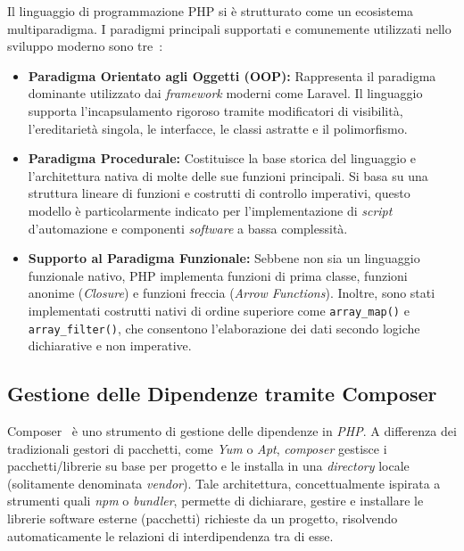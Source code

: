 Il linguaggio di programmazione PHP si è strutturato come un ecosistema multiparadigma. I paradigmi principali supportati e comunemente utilizzati nello sviluppo moderno sono tre~\autocite{PHPPrefaceManual}:
\begin{itemize}
	\item \textbf{Paradigma Orientato agli Oggetti (OOP):} Rappresenta il paradigma dominante utilizzato dai \textit{framework} moderni come Laravel. Il linguaggio supporta l'incapsulamento rigoroso tramite modificatori di visibilità, l'ereditarietà singola, le interfacce, le classi astratte e il polimorfismo.
	\item \textbf{Paradigma Procedurale:} Costituisce la base storica del linguaggio e l'architettura nativa di molte delle sue funzioni principali. Si basa su una struttura lineare di funzioni e costrutti di controllo imperativi, questo modello è particolarmente indicato per l'implementazione di \textit{script} d'automazione e componenti \textit{software} a bassa complessità.
	\item \textbf{Supporto al Paradigma Funzionale:} Sebbene non sia un linguaggio funzionale nativo, PHP implementa funzioni di prima classe, funzioni anonime (\textit{Closure}) e funzioni freccia (\textit{Arrow Functions}). Inoltre, sono stati implementati costrutti nativi di ordine superiore come \texttt{array\_map()} e \texttt{array\_filter()}, che consentono l'elaborazione dei dati secondo logiche dichiarative e non imperative.
\end{itemize}


\subsection{Gestione delle Dipendenze tramite Composer}
Composer~\autocite{Composer} è uno strumento di gestione delle dipendenze in \textit{PHP}. A differenza dei tradizionali gestori di pacchetti, come \textit{Yum} o \textit{Apt}, \textit{composer}
gestisce i pacchetti/librerie su base per progetto e le installa in una \textit{directory} locale (solitamente denominata \textit{vendor}). Tale architettura, concettualmente ispirata a strumenti quali \textit{npm} o \textit{bundler}, permette di dichiarare, gestire e
installare le librerie software esterne (pacchetti) richieste da un progetto,
risolvendo automaticamente le relazioni di interdipendenza tra di esse.\\

